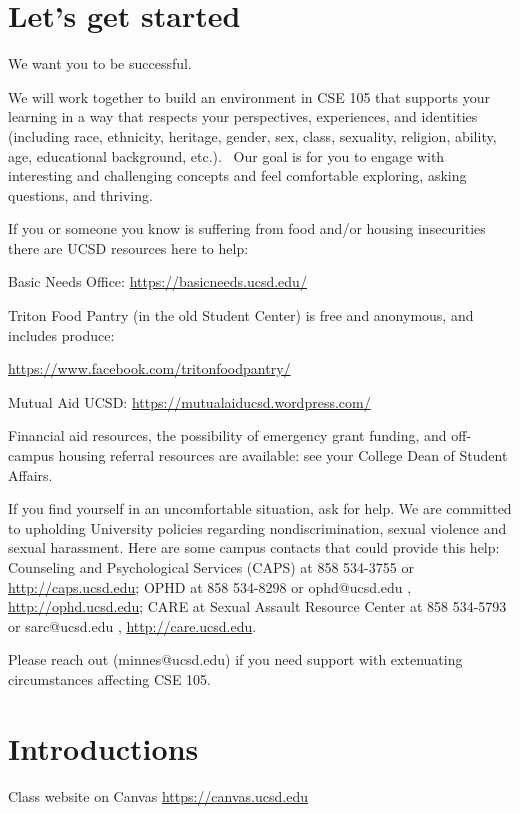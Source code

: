 

\section*{Let's get started}

We want you to be successful. 

We will work together to build an 
environment in CSE 105 that supports your learning
in a way that respects your
perspectives, experiences, and identities (including race, ethnicity, heritage, gender, sex, 
class, sexuality, religion, ability, age, educational background, etc.).  
Our goal is for you to  engage
with interesting and challenging concepts and 
feel comfortable exploring, asking questions, and thriving.

If you or someone you know is suffering from food and/or housing insecurities 
there are UCSD resources here to help:

Basic Needs Office: \href{https://basicneeds.ucsd.edu/}{https://basicneeds.ucsd.edu/}

Triton Food Pantry (in the old Student Center)
is free and anonymous, and includes produce: 

\href{https://www.facebook.com/tritonfoodpantry/}{https://www.facebook.com/tritonfoodpantry/}

Mutual Aid UCSD: \href{https://mutualaiducsd.wordpress.com/}{https://mutualaiducsd.wordpress.com/}

Financial aid resources, the possibility of emergency grant funding, and off-campus housing referral 
resources are available: see your College Dean of Student Affairs.

If you find yourself in an uncomfortable situation, ask for help. 
We are committed to upholding University policies regarding nondiscrimination, sexual violence and sexual harassment.
Here are some campus contacts that could provide this help: 
Counseling and Psychological Services (CAPS) at 858 534-3755 or \href{http://caps.ucsd.edu}{http://caps.ucsd.edu}; 
OPHD at 858 534-8298 or ophd@ucsd.edu , \href{http://ophd.ucsd.edu}{http://ophd.ucsd.edu};
CARE at Sexual Assault Resource Center at 858 534-5793 or sarc@ucsd.edu , \href{http://care.ucsd.edu}{http://care.ucsd.edu}.


Please reach out (minnes@ucsd.edu) if you need support with extenuating circumstances affecting CSE 105.

\vfill

\section*{Introductions}
Class website on Canvas \href{https://canvas.ucsd.edu/}{https://canvas.ucsd.edu}


